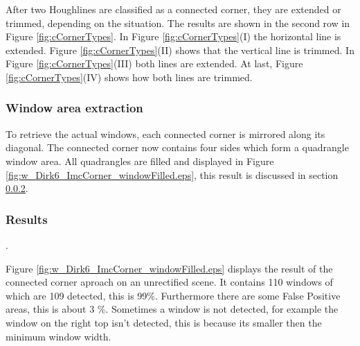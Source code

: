 After two Houghlines are classified as a connected corner, they are extended or
trimmed, depending on the situation. The results are shown in the second row in
Figure \ref{fig:cCornerTypes}.
In Figure \ref{fig:cCornerTypes}(I)  the horizontal line is extended.  Figure
\ref{fig:cCornerTypes}(II) shows that the vertical line is trimmed.  In Figure
\ref{fig:cCornerTypes}(III) both lines are extended.  At last, Figure
\ref{fig:cCornerTypes}(IV) shows how both lines are trimmed.


\subsubsection{Window area extraction}
To retrieve the actual windows, each connected corner is mirrored along its
diagonal. The connected corner now contains four sides which form a 
quadrangle window area.
All quadrangles are filled and displayed in Figure
\ref{fig:w_Dirk6_ImcCorner_windowFilled.eps}, this result is discussed in section
\ref{sec:results}.


\subsubsection{Results}
\label{sec:results}.


\newpage
{}

Figure \ref{fig:w_Dirk6_ImcCorner_windowFilled.eps} displays the result of the
connected corner aproach on an unrectified scene.  It contains 110 windows of
which are 109 detected, this is 99\%. Furthermore there are some False Positive
areas, this is about 3 \%.
Sometimes a window is not detected, for example the window on the right top
isn't detected, this is because its smaller then the minimum window width.\\

